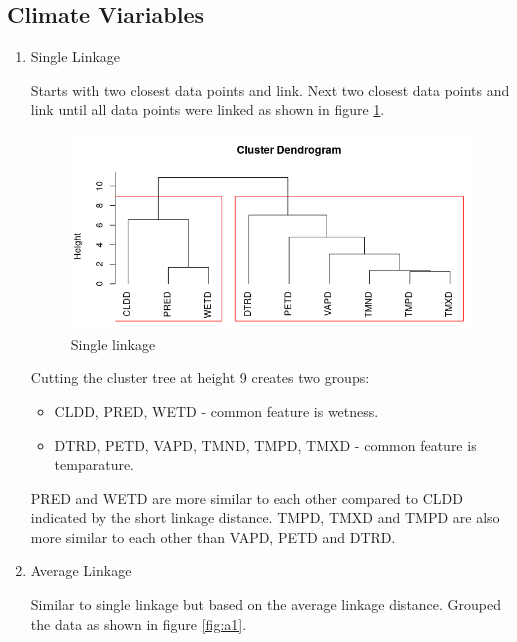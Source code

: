 \documentclass[12pt,a4paper]{article}
\begin{document}
\subsection{Climate Viariables}
\begin{enumerate}[label=\roman*)]
	\item Single Linkage

\noindent Starts with two closest data points and link. Next two closest data points and link until all data points were linked as shown in figure \ref{fig:rplots1}.


\begin{figure}[h]
	\centering
	\includegraphics[width=0.7\linewidth]{S1}
	\caption{Single linkage}
	\label{fig:rplots1}
\end{figure}
\noindent Cutting the cluster tree at height 9 creates two groups:
\begin{itemize}
	\item CLDD, PRED, WETD - common feature is wetness.
	\item DTRD, PETD, VAPD, TMND, TMPD, TMXD - common feature is temparature.
\end{itemize} 
PRED and WETD are more similar to each other compared to CLDD indicated by the short linkage distance. TMPD, TMXD and TMPD are also more similar to each other than VAPD, PETD and DTRD.

\item Average Linkage

\noindent Similar to single linkage but based on the average linkage distance. Grouped the data as shown in figure \ref{fig:a1}.


\end{enumerate}
\end{document}
